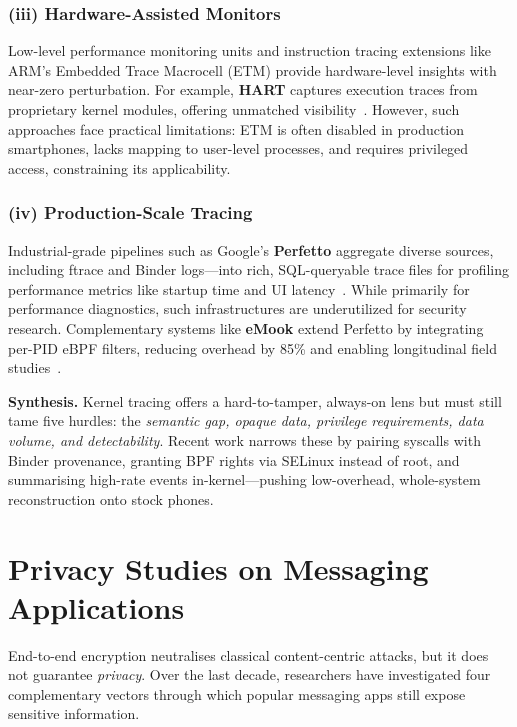 \documentclass[a4paper,12pt]{report}
\begin{document}
\subsubsection*{(iii) Hardware-Assisted Monitors}
Low-level performance monitoring units and instruction tracing extensions like ARM’s Embedded Trace Macrocell (ETM) provide hardware-level insights with near-zero perturbation. For example, \textbf{HART} captures execution traces from proprietary kernel modules, offering unmatched visibility~\cite{zhang2020hart}. However, such approaches face practical limitations: ETM is often disabled in production smartphones, lacks mapping to user-level processes, and requires privileged access, constraining its applicability.

\subsubsection*{(iv) Production-Scale Tracing}
Industrial-grade pipelines such as Google’s \textbf{Perfetto} aggregate diverse sources, including ftrace and Binder logs—into rich, SQL-queryable trace files for profiling performance metrics like startup time and UI latency~\cite{maganti2022perfetto}. While primarily for performance diagnostics, such infrastructures are underutilized for security research. Complementary systems like \textbf{eMook} extend Perfetto by integrating per-PID eBPF filters, reducing overhead by 85\% and enabling longitudinal field studies~\cite{williams2024emook}.

\medskip
\noindent\textbf{Synthesis.}
Kernel tracing offers a hard-to-tamper, always-on lens but must still tame five hurdles: the \emph{semantic gap, opaque data, privilege requirements, data volume, and detectability}. Recent work narrows these by pairing syscalls with Binder provenance, granting BPF rights via SELinux instead of root, and summarising high-rate events in-kernel—pushing low-overhead, whole-system reconstruction onto stock phones.


\section{Privacy Studies on Messaging Applications}
\label{sec:rw:privacy-im}

End-to-end encryption neutralises classical content-centric attacks, but it does not guarantee \emph{privacy}. Over the last decade, researchers have investigated four complementary vectors through which popular messaging apps still expose sensitive information.
\end{document}
